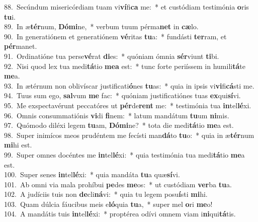 {88.~}Secúndum misericórdiam tuam vi\textbf{ví}fi\textbf{ca} me:~* et custódiam testimónia \textbf{o}ris \textbf{tu}i.\\
{89.~}In æ\textbf{tér}num, \textbf{Dó}\textbf{mi}ne,~* verbum tuum pérma\textbf{net} in \textbf{cæ}lo.\\
{90.~}In generatiónem et generatiónem \textbf{vé}ritas \textbf{tu}a:~* fundásti \textbf{ter}ram, et \textbf{pér}manet.\\
{91.~}Ordinatióne tua perse\textbf{vé}rat \textbf{di}es:~* quóniam ómnia \textbf{sér}viunt \textbf{ti}bi.\\
{92.~}Nisi quod lex tua medi\textbf{tá}tio \textbf{me}\textbf{a} est:~* tunc forte periíssem in humili\textbf{tá}te \textbf{me}a.\\
{93.~}In ætérnum non oblivíscar justificati\textbf{ó}nes \textbf{tu}as:~* quia in ipsis vi\textbf{vi}fi\textbf{cá}sti me.\\
{94.~}Tuus sum ego, \textbf{sal}vum \textbf{me} fac:~* quóniam justificatiónes tuas \textbf{ex}qui\textbf{sí}vi.\\
{95.~}Me exspectavérunt peccatóres ut \textbf{pér}de\textbf{rent} me:~* testimónia tua \textbf{in}tel\textbf{lé}xi.\\
{96.~}Omnis consummatiónis \textbf{vi}di \textbf{fi}nem:~* latum mandátum \textbf{tu}um \textbf{ni}mis.\\
{97.~}Quómodo diléxi legem \textbf{tu}am, \textbf{Dó}\textbf{mi}ne?~* tota die medi\textbf{tá}tio \textbf{me}a est.\\
{98.~}Super inimícos meos prudéntem me fecísti man\textbf{dá}to \textbf{tu}o:~* quia in æ\textbf{tér}num \textbf{mi}hi est.\\
{99.~}Super omnes docéntes me \textbf{in}tel\textbf{lé}xi:~* quia testimónia tua medi\textbf{tá}tio \textbf{me}a est.\\
{100.~}Super senes \textbf{in}tel\textbf{lé}xi:~* quia mandáta \textbf{tu}a quæ\textbf{sí}vi.\\
{101.~}Ab omni via mala prohíbui \textbf{pe}des \textbf{me}os:~* ut custódiam \textbf{ver}ba \textbf{tu}a.\\
{102.~}A judíciis tuis non \textbf{de}cli\textbf{ná}vi:~* quia tu legem posu\textbf{í}sti \textbf{mi}hi.\\
{103.~}Quam dúlcia fáucibus meis e\textbf{ló}quia \textbf{tu}a,~* super mel \textbf{o}ri \textbf{me}o!\\
{104.~}A mandátis tuis \textbf{in}tel\textbf{lé}xi:~* proptérea odívi omnem viam i\textbf{ni}qui\textbf{tá}tis.\\

